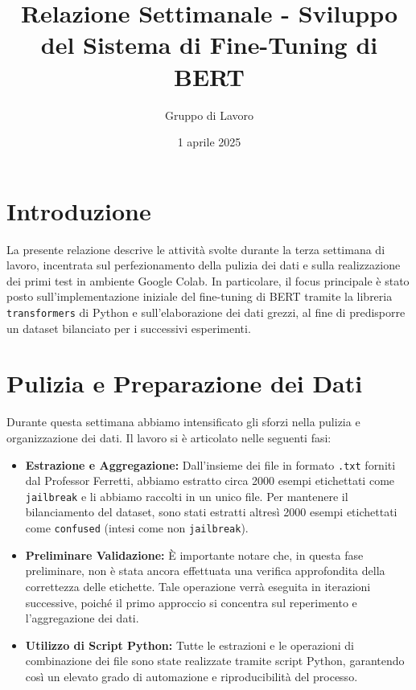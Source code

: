 \documentclass[a4paper,12pt]{article}
\title{\textbf{Relazione Settimanale - Sviluppo del Sistema di Fine-Tuning di BERT}}
\author{Gruppo di Lavoro}
\date{1 aprile 2025}
\begin{document}
\maketitle

\tableofcontents
\newpage

\section{Introduzione}
La presente relazione descrive le attività svolte durante la terza settimana di lavoro, incentrata sul perfezionamento della pulizia dei dati e sulla realizzazione dei primi test in ambiente Google Colab. In particolare, il focus principale è stato posto sull'implementazione iniziale del fine-tuning di BERT tramite la libreria \texttt{transformers} di Python e sull'elaborazione dei dati grezzi, al fine di predisporre un dataset bilanciato per i successivi esperimenti.

\section{Pulizia e Preparazione dei Dati}
Durante questa settimana abbiamo intensificato gli sforzi nella pulizia e organizzazione dei dati. Il lavoro si è articolato nelle seguenti fasi:
\begin{itemize}
    \item \textbf{Estrazione e Aggregazione:} Dall'insieme dei file in formato \texttt{.txt} forniti dal Professor Ferretti, abbiamo estratto circa 2000 esempi etichettati come \texttt{jailbreak} e li abbiamo raccolti in un unico file. Per mantenere il bilanciamento del dataset, sono stati estratti altresì 2000 esempi etichettati come \texttt{confused} (intesi come non \texttt{jailbreak}).
    \item \textbf{Preliminare Validazione:} È importante notare che, in questa fase preliminare, non è stata ancora effettuata una verifica approfondita della correttezza delle etichette. Tale operazione verrà eseguita in iterazioni successive, poiché il primo approccio si concentra sul reperimento e l’aggregazione dei dati.
    \item \textbf{Utilizzo di Script Python:} Tutte le estrazioni e le operazioni di combinazione dei file sono state realizzate tramite script Python, garantendo così un elevato grado di automazione e riproducibilità del processo.
\end{itemize}
\end{document}
